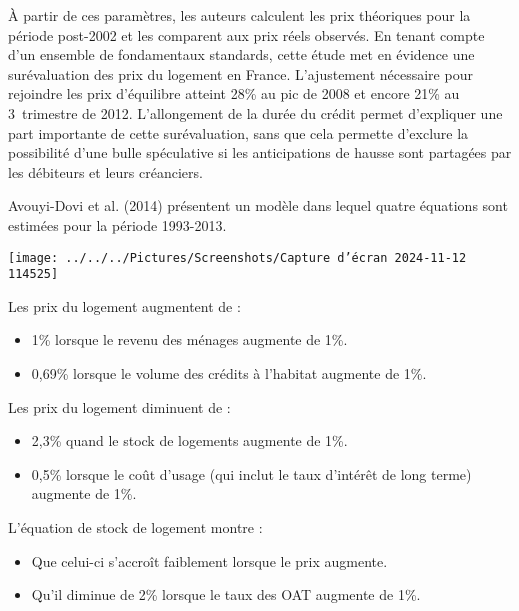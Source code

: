 \documentclass[a4paper, 12pt]{report}
\begin{document}
À partir de ces paramètres, les auteurs calculent les prix théoriques pour la période post-2002 et les comparent aux prix réels observés. En tenant compte d’un ensemble de fondamentaux standards, cette étude met en évidence une surévaluation des prix du logement en France. L’ajustement nécessaire pour rejoindre les prix d’équilibre atteint 28\% au pic de 2008 et encore 21\% au 3\ieme~trimestre de 2012. L’allongement de la durée du crédit permet d’expliquer une part importante de cette surévaluation, sans que cela permette d’exclure la possibilité d’une bulle spéculative si les anticipations de hausse sont partagées par les débiteurs et leurs créanciers.

Avouyi-Dovi et al. (2014) présentent un modèle dans lequel quatre équations sont estimées pour la période 1993-2013.

\begin{center}
	\texttt{[image: ../../../Pictures/Screenshots/Capture d'écran 2024-11-12 114525]}
\end{center}

Les prix du logement augmentent de : 
\begin{itemize}
	\item 1\% lorsque le revenu des ménages augmente de 1\%.
	\item 0,69\% lorsque le volume des crédits à l’habitat augmente de 1\%.
\end{itemize}
Les prix du logement diminuent de : 
\begin{itemize}
	\item 2,3\% quand le stock de logements augmente de 1\%.
	\item 0,5\% lorsque le coût d’usage (qui inclut le taux d’intérêt de long terme) augmente de 1\%.
\end{itemize}
L’équation de stock de logement montre : 
\begin{itemize}
	\item Que celui-ci s’accroît faiblement lorsque le prix augmente.
	\item Qu’il diminue de 2\% lorsque le taux des OAT augmente de 1\%.
\end{itemize}
\end{document}
